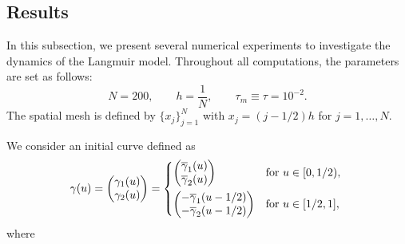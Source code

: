 \documentclass{article}
\theoremstyle{remark}
\theoremstyle{definition}
\numberwithin{equation}{section}
\begin{document}
\subsection{Results}

In this subsection, we present several numerical experiments to investigate the dynamics of the Langmuir model.
Throughout all computations, the parameters are set as follows:
\begin{equation*}
    N=200,\qquad
    h=\frac{1}{N},\qquad
    \tau_m\equiv\tau=10^{-2}.
\end{equation*}
The spatial mesh is defined by $\{x_j\}_{j=1}^N$ with $x_j=(j-1/2)h$ for $j=1,\ldots,N$.

We consider an initial curve defined as
\begin{equation}
    \gamma(u)
    =\begin{pmatrix}
        \gamma_1(u)\\
        \gamma_2(u)
    \end{pmatrix}
    =\begin{dcases*}
        \begin{pmatrix}
            \overline{\gamma}_1(u)\\
            \overline{\gamma}_2(u)
        \end{pmatrix} & for $u\in[0,1/2)$,\\
        \begin{pmatrix}
            -\overline{\gamma}_1(u-1/2)\\
            -\overline{\gamma}_2(u-1/2)
        \end{pmatrix} & for $u\in[1/2,1]$,
    \end{dcases*}
    \label{eq:bola}
\end{equation}
where
\end{document}
